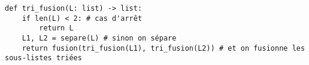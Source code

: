 


\ifprof
\begin{lstlisting}
def tri_fusion(L: list) -> list:
    if len(L) < 2: # cas d'arrêt
        return L
    L1, L2 = separe(L) # sinon on sépare
    return fusion(tri_fusion(L1), tri_fusion(L2)) # et on fusionne les sous-listes triées
\end{lstlisting}
\else
\fi



